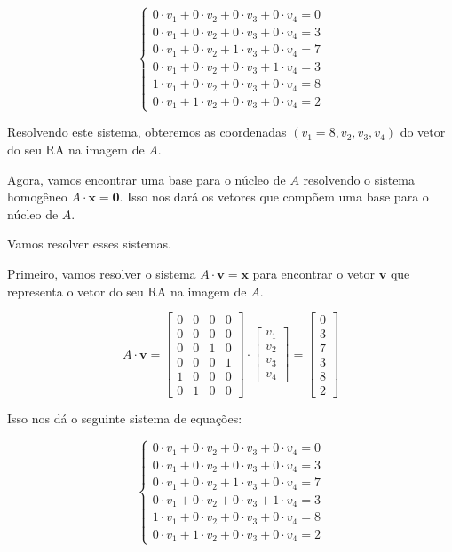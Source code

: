 \[ \begin{cases} 0 \cdot v_1 + 0 \cdot v_2 + 0 \cdot v_3 + 0 \cdot v_4 = 0 \\ 0 \cdot v_1 + 0 \cdot v_2 + 0 \cdot v_3 + 0 \cdot v_4 = 3 \\ 0 \cdot v_1 + 0 \cdot v_2 + 1 \cdot v_3 + 0 \cdot v_4 = 7 \\ 0 \cdot v_1 + 0 \cdot v_2 + 0 \cdot v_3 + 1 \cdot v_4 = 3 \\ 1 \cdot v_1 + 0 \cdot v_2 + 0 \cdot v_3 + 0 \cdot v_4 = 8 \\ 0 \cdot v_1 + 1 \cdot v_2 + 0 \cdot v_3 + 0 \cdot v_4 = 2 \end{cases} \]

Resolvendo este sistema, obteremos as coordenadas \( (v_1 = 8, v_2, v_3, v_4) \) do vetor do seu RA na imagem de \( A \).

Agora, vamos encontrar uma base para o núcleo de \( A \) resolvendo o sistema homogêneo \( A \cdot \mathbf{x} = \mathbf{0} \). Isso nos dará os vetores que compõem uma base para o núcleo de \( A \).

Vamos resolver esses sistemas.

Primeiro, vamos resolver o sistema \( A \cdot \mathbf{v} = \mathbf{x} \) para encontrar o vetor \( \mathbf{v} \) que representa o vetor do seu RA na imagem de \( A \).

\[ A \cdot \mathbf{v} = \begin{bmatrix} 0 & 0 & 0 & 0 \\ 0 & 0 & 0 & 0 \\ 0 & 0 & 1 & 0 \\ 0 & 0 & 0 & 1 \\ 1 & 0 & 0 & 0 \\ 0 & 1 & 0 & 0 \end{bmatrix} \cdot \begin{bmatrix} v_1 \\ v_2 \\ v_3 \\ v_4 \end{bmatrix} = \begin{bmatrix} 0 \\ 3 \\ 7 \\ 3 \\ 8 \\ 2 \end{bmatrix} \]

Isso nos dá o seguinte sistema de equações:

\[ \begin{cases} 0 \cdot v_1 + 0 \cdot v_2 + 0 \cdot v_3 + 0 \cdot v_4 = 0 \\ 0 \cdot v_1 + 0 \cdot v_2 + 0 \cdot v_3 + 0 \cdot v_4 = 3 \\ 0 \cdot v_1 + 0 \cdot v_2 + 1 \cdot v_3 + 0 \cdot v_4 = 7 \\ 0 \cdot v_1 + 0 \cdot v_2 + 0 \cdot v_3 + 1 \cdot v_4 = 3 \\ 1 \cdot v_1 + 0 \cdot v_2 + 0 \cdot v_3 + 0 \cdot v_4 = 8 \\ 0 \cdot v_1 + 1 \cdot v_2 + 0 \cdot v_3 + 0 \cdot v_4 = 2 \end{cases} \]

